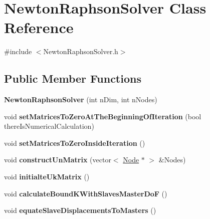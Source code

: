 \hypertarget{classNewtonRaphsonSolver}{}\section{Newton\+Raphson\+Solver Class Reference}
\label{classNewtonRaphsonSolver}


{\ttfamily \#include $<$Newton\+Raphson\+Solver.\+h$>$}

\subsection*{Public Member Functions}
\begin{DoxyCompactItemize}
\item 
\hypertarget{classNewtonRaphsonSolver_a3cd02ecd63a37d6b621ece7f781aeefd}{}{\bfseries Newton\+Raphson\+Solver} (int n\+Dim, int n\+Nodes)\label{classNewtonRaphsonSolver_a3cd02ecd63a37d6b621ece7f781aeefd}

\item 
\hypertarget{classNewtonRaphsonSolver_af399a29680227186a6f029ba70b05abf}{}void {\bfseries set\+Matrices\+To\+Zero\+At\+The\+Beginning\+Of\+Iteration} (bool there\+Is\+Numerical\+Calculation)\label{classNewtonRaphsonSolver_af399a29680227186a6f029ba70b05abf}

\item 
\hypertarget{classNewtonRaphsonSolver_a36d647a13f9942e90e288a42c5444c4d}{}void {\bfseries set\+Matrices\+To\+Zero\+Inside\+Iteration} ()\label{classNewtonRaphsonSolver_a36d647a13f9942e90e288a42c5444c4d}

\item 
\hypertarget{classNewtonRaphsonSolver_a5f8a13d46729cc7fcd1054955375018d}{}void {\bfseries construct\+Un\+Matrix} (vector$<$ \hyperlink{classNode}{Node} $\ast$ $>$ \&Nodes)\label{classNewtonRaphsonSolver_a5f8a13d46729cc7fcd1054955375018d}

\item 
\hypertarget{classNewtonRaphsonSolver_a48b7753542f36889cd030104937d76a3}{}void {\bfseries initialte\+Uk\+Matrix} ()\label{classNewtonRaphsonSolver_a48b7753542f36889cd030104937d76a3}

\item 
\hypertarget{classNewtonRaphsonSolver_aa1e2ec4519853c9acfaf120c4b513651}{}void {\bfseries calculate\+Bound\+K\+With\+Slaves\+Master\+Do\+F} ()\label{classNewtonRaphsonSolver_aa1e2ec4519853c9acfaf120c4b513651}

\item 
\hypertarget{classNewtonRaphsonSolver_ad1670a14238d705e839d7bd80fb42c13}{}void {\bfseries equate\+Slave\+Displacements\+To\+Masters} ()\label{classNewtonRaphsonSolver_ad1670a14238d705e839d7bd80fb42c13}


\end{DoxyCompactItemize}
